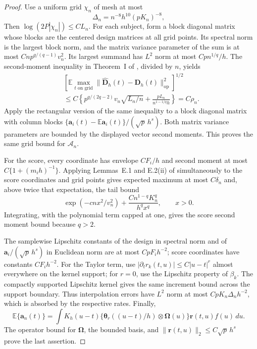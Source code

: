 \documentclass[12pt]{article}
\newcommand{\ba}{{\mathbf a}}
\newcommand{\br}{{\mathbf r}}
\newcommand{\bD}{{\mathbf D}}
\newcommand{\btheta}  {\boldsymbol{\theta}}
\newcommand{\bOmega} {\boldsymbol{\Omega}}
\newcommand{\expect}{\mathbb{E}}
\numberwithin{equation}{section}
\begin{document}
\begin{proof}
Use a uniform grid $\chi_n$ of mesh at most
\[
\Delta_n=n^{-8}h^{10}(pK_n)^{-8},
\]
Then $\log(2P|\chi_n|)\le CL_n$.
For each subject, form a block diagonal matrix whose blocks are the
centered design matrices at all grid points. Its spectral norm is
the largest block norm, and the matrix variance parameter of the sum
is at most $Cnp^{q/(q-1)}v_n^2$. Its largest summand has $L^2$ norm
at most $Cpn^{1/q}/h$.
The second-moment inequality in Theorem~I of
\citet{tropp_expected_2016}, divided by $n$, yields
\[
\begin{aligned}
&\left[\expect\max_{t\text{ on grid}}
\|\widehat{\bD}_h(t)-\bD_h(t)\|_{\mathrm{op}}^2\right]^{1/2}\\
&\le C\left\{p^{q/(2q-2)}v_n\sqrt{L_n/n}
+\frac{pL_n}{n^{1-1/q}h}\right\}=C\rho_n.
\end{aligned}
\]
Apply the rectangular version of the same inequality to a block
diagonal matrix with column blocks
$\{\ba_i(t)-\expect\ba_i(t)\}/(\sqrt p\,h^s)$.
Both matrix variance parameters are bounded by the displayed vector
second moments. This proves the same grid bound for $\mathcal A_n$.

For the score, every coordinate has envelope $CF_i/h$ and second
moment at most $C\{1+(m_i h)^{-1}\}$. Applying Lemmas~E.1 and
E.2(ii) of \citet{chernozhukov_central_2017} simultaneously to the
score coordinates and grid points gives expected maximum at most
$C\delta_n$ and, above twice that expectation, the tail bound
\[
\exp(-cnx^2/v_n^2)+
\frac{Cn^{1-q}K_n^q}{h^q x^q},\qquad x>0.
\]
Integrating, with the polynomial term capped at one, gives the score
second moment bound because $q>2$.

The samplewise Lipschitz constants of the design in spectral norm
and of $\ba_i/(\sqrt p\,h^s)$ in Euclidean norm are at most
$CpF_i h^{-2}$; score coordinates have constants $CF_i h^{-2}$.
For the Taylor term, use
$|\partial_t r_k(t,u)|\le C|u-t|^r$ almost everywhere on the kernel
support; for $r=0$, use the Lipschitz property of $\beta_k$.
The compactly supported Lipschitz kernel gives the same increment
bound across the support boundary. Thus interpolation errors have
$L^2$ norm at most $CpK_n\Delta_n h^{-2}$, which is absorbed by the
respective rates.
Finally,
\[
\expect\{\ba_n(t)\}=\int K_h(u-t)
\{\btheta_r((u-t)/h)\otimes\bOmega(u)\}\br(t,u)f(u)\,du.
\]
The operator bound for $\bOmega$, the bounded basis, and
$\|\br(t,u)\|_2\le C\sqrt p\,h^s$ prove the last assertion.
\end{proof}
\end{document}

